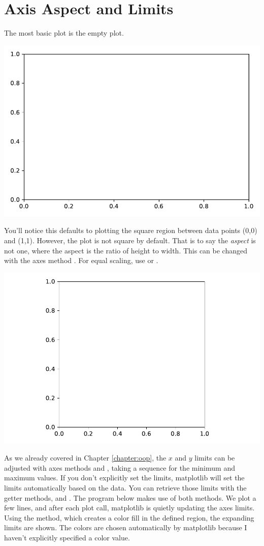 
\section{Axis Aspect and Limits}\label{sec:aspectLim}
The most basic plot is the empty plot. 


\begin{center}
    \includegraphics[width = .6\textwidth]{figures/proseplots/empty.pdf}
\end{center}


You'll notice this defaults to plotting the square region between data points (0,0) and (1,1). However, the plot is not square by default. That is to say the \emph{aspect} is not one, where the aspect is the ratio of height to width. This can be changed with the axes method . For equal scaling, use  or .


\begin{center}
    \includegraphics[width = .6\textwidth]{figures/proseplots/empty-square.pdf}
\end{center}

As we already covered in Chapter \ref{chapter:oop}, the $x$ and $y$ limits can be adjusted with axes methods  and , taking a sequence for the minimum and maximum values. If you don't explicitly set the limits, matplotlib will set the limits automatically based on the data. You can retrieve those limits with the getter methods,  and . 
The program below makes use of both methods. We plot a few lines, and after each plot call, matplotlib is quietly updating the axes limits. Using the  method, which creates a color fill in the defined region, the expanding limits are shown. The colors are chosen automatically by matplotlib because I haven't explicitly specified a color value. 

